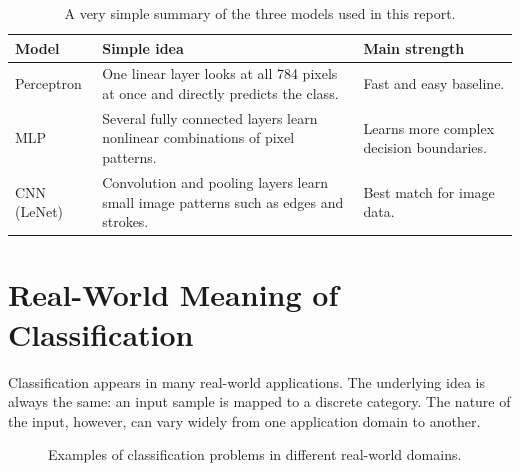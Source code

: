 \documentclass[11pt]{article}
\begin{document}
\begin{table}[H]
\centering
\begin{tabular}{>{\raggedright\arraybackslash}p{2.4cm} >{\raggedright\arraybackslash}p{6.0cm} >{\raggedright\arraybackslash}p{4.1cm}}
\toprule
\textbf{Model} & \textbf{Simple idea} & \textbf{Main strength} \\
\midrule
Perceptron & One linear layer looks at all 784 pixels at once and directly predicts the class. & Fast and easy baseline. \\
MLP & Several fully connected layers learn nonlinear combinations of pixel patterns. & Learns more complex decision boundaries. \\
CNN (LeNet) & Convolution and pooling layers learn small image patterns such as edges and strokes. & Best match for image data. \\
\bottomrule
\end{tabular}
\caption{A very simple summary of the three models used in this report.}
\label{tab:plaincompare}
\end{table}

\section{Real-World Meaning of Classification}

Classification appears in many real-world applications. The underlying idea is always the same: an input sample is mapped to a discrete category. The nature of the input, however, can vary widely from one application domain to another.

\begin{figure}[H]
\centering
{}
\caption{Examples of classification problems in different real-world domains.}
\label{fig:domains}
\end{figure}
\end{document}
